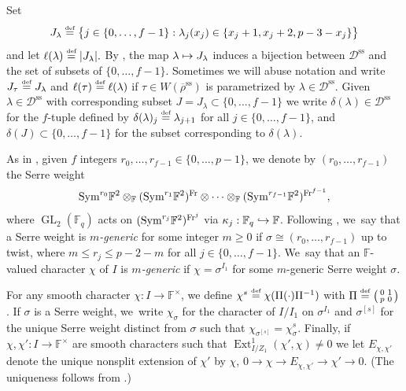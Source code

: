 \documentclass[JEP,XML,SOM,Unicode,NoFloatCountersInSection, NoEqCountersInSection,published]{cedram}
\newenvironment{smallpmatrix}{\big(\begin{smallmatrix}}{\end{smallmatrix}\big)}
\newcommand\mto{\mathchoice{\longmapsto}{\mapsto}{\mapsto}{\mapsto}}
\newcommand\hto{\mathrel{\lhook\joinrel\to}}
\newcommand{\defeq}{\stackrel{\textrm{\tiny{\upshape{def}}}}{=}}
\newcommand{\F}{\mathbb{F}}
\newcommand{\D}{\mathscr D}
\renewcommand{\ss}{\mathrm{ss}}
\newcommand{\Fq}{\mathbb{F}_{q}}
\newcommand{\brho}{\overline{\rho}}
\newcommand{\s}{^\times}
\DeclareMathOperator{\Ext}{Ext}
\DeclareMathOperator{\GL}{GL}
\theoremstyle{plain}
\theoremstyle{definition}
\begin{document}
Set
\begin{equation}\label{eq:J-lambda}
J_{\lambda}\defeq
\bigl\{j\in\{0,\dots,f-1\}: \lambda_j(x_j)\in \{x_j+1,x_j+2,p-3-x_j\}\bigr\}
\end{equation}
and let $\ell(\lambda) \defeq |J_\lambda|.$
By \cite[\S 11]{BP}, the map $\lambda \mto J_\lambda$ induces a bijection between $\mathscr{D}^\ss$ and the set of subsets of $\{0,\dots,f-1\}$.
Sometimes we will abuse notation and write $J_\tau \defeq J_\lambda$ and $\ell(\tau) \defeq \ell(\lambda)$ if $\tau \in W(\brho^\ss)$ is parametrized by $\lambda \in \D^\ss$.
Given $\lambda\in \D^\ss$ with corresponding subset $J=J_\lambda\subset\{0,\dots,f-1\}$ we write $\delta(\lambda)\in \D^\ss$ for the $f$-tuple defined by $\delta(\lambda)_j\defeq \lambda_{j+1}$ for all $j\in\{0,\dots,f-1\}$, and $\delta(J)\subset\{0,\dots,f-1\}$ for the subset corresponding to $\delta(\lambda)$.

As in \cite[\S 1]{BP}, given $f$ integers $r_0,\dots,r_{f-1}\in\{0,\dots,p-1\}$, we denote by $(r_0,\dots,r_{f-1})$ the Serre weight
\begin{equation*}
\mathrm{Sym}^{r_0}\F^2\otimes_{\F}(\mathrm{Sym}^{r_1}\F^2)^{\rm Fr}\otimes\cdots\otimes_{\F}(\mathrm{Sym}^{r_{f-1}}\F^2)^{{\rm Fr}^{f-1}},
\end{equation*}
where $\GL_2(\Fq)$ acts on $(\mathrm{Sym}^{r_j}\F^2)^{{\rm Fr}^j}$ via $\kappa_j:\Fq\hto \F$.
Following \cite[\S 2]{HuWang2}, we~say that a Serre weight is \emph{$m$-generic} for some integer $m\geq 0$ if $\sigma\cong (r_0,\dots,r_{f-1})$ up to twist, where $m\leq r_j\leq p-2-m$ for all $j\in \{0,\dots,f-1\}$. We~say that an $\F$-valued character $\chi$ of $I$ is \emph{$m$-generic} if $\chi=\sigma^{I_1}$ for some $m$-generic Serre weight $\sigma$.

For any smooth character $\chi: I \to \F\s$, we define $\chi^s\defeq \chi(\Pi (\cdot) \Pi^{-1})$ with $\Pi\defeq \begin{smallpmatrix}0&1\\ p&0\end{smallpmatrix}$.
If $\sigma$ is a Serre weight, we~write $\chi_\sigma$ for the character of $I/I_1$ on $\sigma^{I_1}$ and $\sigma^{[s]}$ for the unique Serre weight distinct from $\sigma$ such that $\chi_{\sigma^{[s]}}=\chi_{\sigma}^s$.
Finally, if~$\chi,\chi': I\to\F^\times$ are smooth characters such that $\Ext^1_{I/Z_1}(\chi',\chi)\neq 0$ we let $E_{\chi,\chi'}$ denote the unique nonsplit extension of $\chi'$ by $\chi$, \ie $0\to\chi\to E_{\chi,\chi'}\to\chi'\to 0$.
(The uniqueness follows from \cite[Lem.\,2.4]{yongquan-algebra}.)
\end{document}

